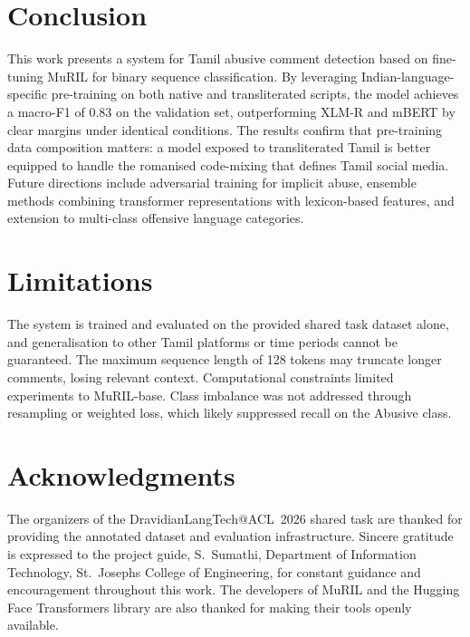 \documentclass[11pt]{article}
\begin{document}
\section{Conclusion}
This work presents a system for Tamil abusive comment detection based on fine-tuning
MuRIL for binary sequence classification. By leveraging Indian-language-specific
pre-training on both native and transliterated scripts, the model achieves a macro-F1
of 0.83 on the validation set, outperforming XLM-R and mBERT by clear margins under
identical conditions. The results confirm that pre-training data composition matters:
a model exposed to transliterated Tamil is better equipped to handle the romanised
code-mixing that defines Tamil social media. Future directions include adversarial
training for implicit abuse, ensemble methods combining transformer representations
with lexicon-based features, and extension to multi-class offensive language categories.

\section*{Limitations}
The system is trained and evaluated on the provided shared task dataset alone, and
generalisation to other Tamil platforms or time periods cannot be guaranteed. The
maximum sequence length of 128 tokens may truncate longer comments, losing relevant
context. Computational constraints limited experiments to MuRIL-base. Class imbalance
was not addressed through resampling or weighted loss, which likely suppressed recall
on the Abusive class.

\section*{Acknowledgments}
The organizers of the DravidianLangTech@ACL~2026 shared task
\citep{abusive-tamil-women-dravidianlangtech-acl-2026} are thanked for providing
the annotated dataset and evaluation infrastructure. Sincere gratitude is expressed
to the project guide, S.~Sumathi, Department of Information Technology,
St.~Joseph\textquotesingle{}s College of Engineering, for constant guidance and
encouragement throughout this work. The developers of MuRIL and the Hugging Face
Transformers library are also thanked for making their tools openly available.


\end{document}
